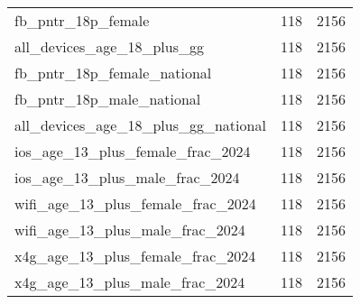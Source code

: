 \begin{table}[ht]
\begin{tabular}{lrr}
  fb\_pntr\_18p\_female & 118 & 2156 \\ 
  all\_devices\_age\_18\_plus\_gg & 118 & 2156 \\ 
  fb\_pntr\_18p\_female\_national & 118 & 2156 \\ 
  fb\_pntr\_18p\_male\_national & 118 & 2156 \\ 
  all\_devices\_age\_18\_plus\_gg\_national & 118 & 2156 \\ 
  ios\_age\_13\_plus\_female\_frac\_2024 & 118 & 2156 \\ 
  ios\_age\_13\_plus\_male\_frac\_2024 & 118 & 2156 \\ 
  wifi\_age\_13\_plus\_female\_frac\_2024 & 118 & 2156 \\ 
  wifi\_age\_13\_plus\_male\_frac\_2024 & 118 & 2156 \\ 
  x4g\_age\_13\_plus\_female\_frac\_2024 & 118 & 2156 \\ 
  x4g\_age\_13\_plus\_male\_frac\_2024 & 118 & 2156 \\ 
   \hline
\end{tabular}
\end{table}
